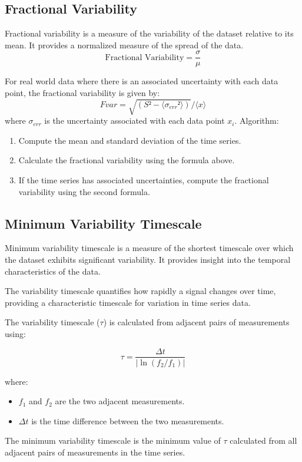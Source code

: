 \subsection{Fractional Variability}
Fractional variability is a measure of the variability of the dataset relative to its mean. It provides a normalized measure of the spread of the data.
\begin{equation}
    \text{Fractional Variability} = \dfrac{\sigma}{\mu}
    \label{eq:fractional_variability}
\end{equation}

 For real world data where there is an associated uncertainty with each data point, the fractional variability is given by:
\begin{equation}
    Fvar = \sqrt{(S² - \langle\sigma_{err}²\rangle)} / \langle x \rangle
    \label{eq:fractional_variability_real}
\end{equation}
where $\sigma_{err}$ is the uncertainty associated with each data point $x_i$.
Algorithm:
\begin{enumerate}
    \item Compute the mean and standard deviation of the time series.
    \item Calculate the fractional variability using the formula above.
    \item If the time series has associated uncertainties, compute the fractional variability using the second formula.
\end{enumerate}

\subsection{Minimum Variability Timescale}
Minimum variability timescale is a measure of the shortest timescale over which the dataset exhibits significant variability. It provides insight into the temporal characteristics of the data.

The variability timescale quantifies how rapidly a signal changes over time, providing a characteristic timescale for variation in time series data.

The variability timescale ($\tau$) is calculated from adjacent pairs of measurements using:

\begin{equation} \tau = \frac{\Delta t}{|\ln(f_2/f_1)|} \end{equation}

where:
\begin{itemize}
    \item \(f_1\) and \(f_2\) are the two adjacent measurements.
    \item \(\Delta t\) is the time difference between the two measurements.
\end{itemize}
The minimum variability timescale is the minimum value of $\tau$ calculated from all adjacent pairs of measurements in the time series.

